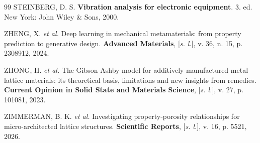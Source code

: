 \begin{thebibliography}{99}
STEINBERG, D. S. \textbf{Vibration analysis for electronic equipment}. 3. ed. New York: John Wiley \& Sons, 2000.

ZHENG, X. \textit{et al.} Deep learning in mechanical metamaterials: from property prediction to generative design. \textbf{Advanced Materials}, [\textit{s. l.}], v. 36, n. 15, p. 2308912, 2024.

ZHONG, H. \textit{et al.} The Gibson-Ashby model for additively manufactured metal lattice materials: its theoretical basis, limitations and new insights from remedies. \textbf{Current Opinion in Solid State and Materials Science}, [\textit{s. l.}], v. 27, p. 101081, 2023.

ZIMMERMAN, B. K. \textit{et al.} Investigating property-porosity relationships for micro-architected lattice structures. \textbf{Scientific Reports}, [\textit{s. l.}], v. 16, p. 5521, 2026.

\end{thebibliography}

